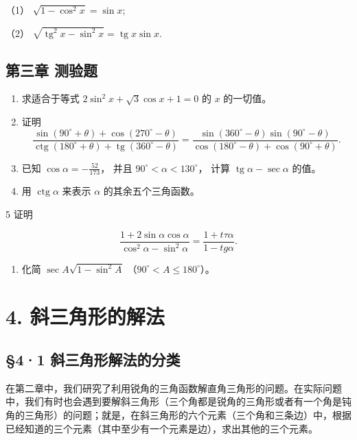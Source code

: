（1） \(\sqrt{1 - \cos^2 x} = \sin x;\)

（2）
\(\sqrt{\operatorname{tg}^2 x - \sin^2 x} = \operatorname{tg} x \sin x.\)

\section{第三章 测验题}

\begin{enumerate}
\item
  求适合于等式 \(2\sin^2 x + \sqrt{3}\cos x + 1 = 0\) 的 \(x\)
  的一切值。
\item
  证明
\[
\frac {\sin (90 ^{\circ} + \theta) + \cos (270 ^{\circ} - \theta)}{\operatorname{ctg} (180 ^{\circ} + \theta) + \operatorname{tg} (360 ^{\circ} - \theta)} = \frac {\sin (360 ^{\circ} - \theta) \sin (90 ^{\circ} - \theta)}{\cos (180 ^{\circ} - \theta) + \cos (90 ^{\circ} + \theta)}.
\]
\item
  已知 \(\cos \alpha = -\frac{52}{173}\)， 并且
  \(90^{\circ} < \alpha < 130^{\circ}\)， 计算
  \(\operatorname{tg} \alpha - \sec \alpha\) 的值。
\item
  用 \(\operatorname{ctg} \alpha\) 来表示 \(\alpha\)
  的其余五个三角函数。
\end{enumerate}

5 证明

\[
\frac {1 + 2 \sin \alpha \cos \alpha}{\cos^ {2} \alpha - \sin^ {2} \alpha} = \frac {1 + t \tau \alpha}{1 - t g \alpha}.
\]

\begin{enumerate}[start=6]
\item
  化简 \(\sec A\sqrt{1 - \sin^2A}\)
  （\(90^\circ < A \leqslant 180^\circ\)）。
\end{enumerate}

\chapter{4. 斜三角形的解法}

\section{§4·1 斜三角形解法的分类}

在第二章中，我们研究了利用锐角的三角函数解直角三角形的问题。在实际问题中，我们有时也会遇到要解斜三角形（三个角都是锐角的三角形或者有一个角是钝角的三角形）的问题；就是，在斜三角形的六个元素（三个角和三条边）中，根据已经知道的三个元素（其中至少有一个元素是边），求出其他的三个元素。

